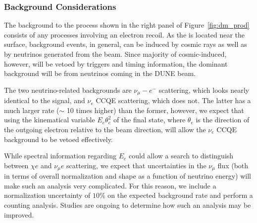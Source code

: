 \subsubsection{Background Considerations}
 The background to the process shown in the right panel of Figure~\ref{fig:dm_prod} consists of any processes involving an electron recoil. As the  is located near the surface, background events, in general, can be induced by cosmic rays as well as by neutrinos generated from the beam. Since majority of cosmic-induced, however, will be vetoed by triggers and timing information, the dominant background will be from neutrinos coming in the DUNE beam.

The two neutrino-related backgrounds are $\nu_\mu -e^-$ scattering, which looks nearly identical to the signal, and $\nu_e$ CCQE scattering, which does not. The latter has a much larger rate ($\sim$ 10 times higher) than the former, however, we expect that using the kinematical variable $E_e \theta_e^2$ of the final state, where $\theta_e$ is the direction of the outgoing electron relative to the beam direction, will allow the $\nu_e$ CCQE background to be vetoed effectively.

While spectral information regarding $E_e$ could allow a search to distinguish between $\chi e$ and $\nu_\mu e$ scattering, we expect that uncertainties in the $\nu_\mu$ flux (both in terms of overall normalization and shape as a function of neutrino energy) will make such an analysis very complicated. For this reason, we include a normalization uncertainty of $10\%$ on the expected background rate and perform a counting analysis. Studies are ongoing to determine how such an analysis may be improved.

